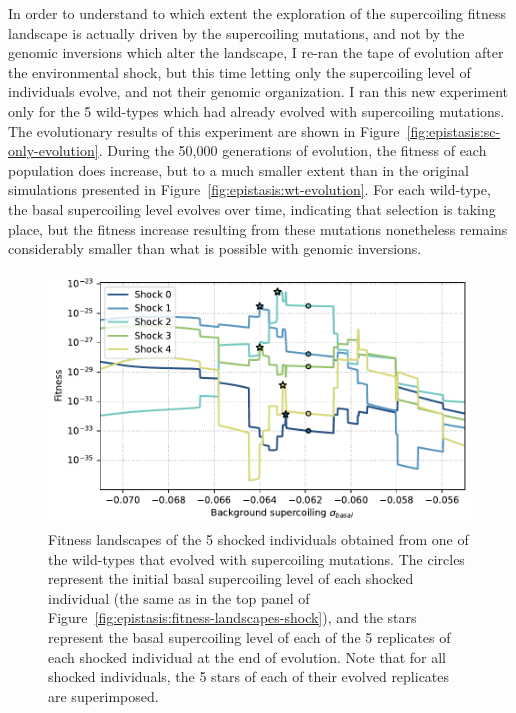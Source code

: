 In order to understand to which extent the exploration of the supercoiling fitness landscape is actually driven by the supercoiling mutations, and not by the genomic inversions which alter the landscape, I re-ran the tape of evolution after the environmental shock, but this time letting only the supercoiling level of individuals evolve, and not their genomic organization.
I ran this new experiment only for the 5 wild-types which had already evolved with supercoiling mutations.
The evolutionary results of this experiment are shown in Figure~\ref{fig:epistasis:sc-only-evolution}.
During the 50,000 generations of evolution, the fitness of each population does increase, but to a much smaller extent than in the original simulations presented in Figure~\ref{fig:epistasis:wt-evolution}.
For each wild-type, the basal supercoiling level evolves over time, indicating that selection is taking place, but the fitness increase resulting from these mutations nonetheless remains considerably smaller than what is possible with genomic inversions.

\begin{figure}
\centering
\includegraphics[width=\textwidth]{epistasis/img/with-sc/fitness_landscapes_wt_01_with_evolved.pdf}
\caption[Fitness landscapes with only supercoiling mutations]{Fitness landscapes of the 5 shocked individuals obtained from one of the wild-types that evolved with supercoiling mutations.
The circles represent the initial basal supercoiling level of each shocked individual (the same as in the top panel of Figure~\ref{fig:epistasis:fitness-landscapes-shock}), and the stars represent the basal supercoiling level of each of the 5 replicates of each shocked individual at the end of evolution.
Note that for all shocked individuals, the 5 stars of each of their evolved replicates are superimposed.}
\label{fig:epistasis:sc-only-fitness-landscape}
\end{figure}

